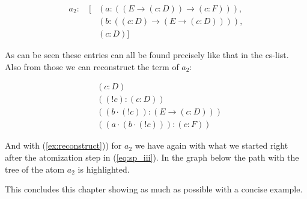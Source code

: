 \begin{equation}
\begin{split}
	a_2: \quad [&(a: ((E \rightarrow (c:D)) \rightarrow (c:F))), \\
	&(b: ((c:D) \rightarrow (E \rightarrow (c:D)))), \\
	&(c: D)]
\end{split}
\end{equation}

As can be seen these entries can all be found precisely like that in the cs-list. Also from those we can reconstruct the term of $a_2$: 

\begin{align}
	& (c:D) \\
	& ((!c):(c:D)) \\
	& ((b\cdot(!c)):(E \rightarrow (c:D)))\\
	& ((a\cdot(b\cdot(!c))):(c:F)) \label{ex:reconstruct}
\end{align}

And with (\ref{ex:reconstruct})) for $a_2$ we have again with what we started right after the atomization step in (\ref{eq:sp_iii}). In the graph below the path with the tree of the atom $a_2$ is highlighted.



\bigskip
This concludes this chapter showing as much as possible with a concise example.